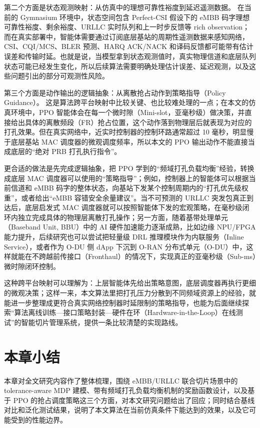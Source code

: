 第二个方面是状态观测映射：从仿真中的理想可靠性裕度到延迟遥测数据。 在当前的 Gymnasium 环境中，状态空间包含 Perfect-CSI 假设下的 eMBB 码字理想可靠性裕度、剩余裕度、URLLC 实时队列和上一时步反馈等 rich observation；而在真实部署中，智能体需要通过订阅底层基站的周期性遥测数据来感知网络，CSI、CQI/MCS、BLER 预测、HARQ ACK/NACK 和译码反馈都可能带有估计误差和传输时延。也就是说，当模型拿到状态观测值时，真实物理信道和底层队列状态可能已经发生变化，所以后续算法需要明确处理估计误差、延迟观测，以及这些问题引出的部分可观测性风险。

第三个方面是动作输出的逻辑抽象：从离散抢占动作到策略指导（Policy Guidance）。 这是算法跨平台映射中比较关键、也比较难处理的一点；在本文的仿真环境中，PPO 智能体会在每一个微时隙（Mini-slot，亚毫秒级）做决策，并直接给出具体的离散频段（FR）抢占位置，这个动作落到物理层后就表现为对应的打孔效果。但在真实网络中，近实时控制器的控制环路通常超过 10 毫秒，明显慢于底层基站 MAC 调度器的微观调度频率，所以本文的 PPO 输出动作不能直接当成底层的``绝对 PRB 打孔执行指令''。

更合适的做法是先完成逻辑抽象，把 PPO 学到的``频域打孔负载均衡''经验，转换成底层 MAC 调度器可以使用的``策略指导''；例如，控制器上的智能体可以根据当前信道和 eMBB 码字的整体状态，向基站下发某个控制周期内的``打孔优先级权重''，或者给出``eMBB 容错安全余量建议''。当不可预测的 URLLC 突发包真正到达后，底层启发式 MAC 调度器就可以按照智能体下发的宏观策略，在毫秒级闭环内独立完成具体的物理层离散打孔操作；另一方面，随着基带处理单元（Baseband Unit, BBU）中的 AI 硬件加速能力逐渐成熟，比如边缘 NPU/FPGA 能力提升，后续研究也可以尝试把轻量级 DRL 推理模块作为内联服务（Inline Service），或者作为 O-DU 侧 dApp 下沉到 O-RAN 分布式单元（O-DU）中，这样就能在不跨越前传接口（Fronthaul）的情况下，实现真正的亚毫秒级（Sub-ms）微时隙闭环控制。

这种跨平台映射可以理解为：上层智能体先给出策略意图，底层调度器再执行更细的微观决策；这样一来，本文算法里把打孔压力分散到不同频域资源上的经验，就能进一步整理成更符合真实网络控制器时延限制的策略指导，也能为后面继续探索``算法离线训练---接口策略封装---硬件在环（Hardware-in-the-Loop）在线测试''的智能切片管理系统，提供一条比较清楚的实现路线。

\section{本章小结}\label{54-ux672cux7ae0ux5c0fux7ed3}

本章对全文研究内容作了整体梳理，围绕 eMBB/URLLC 联合切片场景中的 tolerance-aware MDP 建模、带有频域打孔负载均衡机制的奖励函数设计，以及基于 PPO 的抢占调度策略这三个方面，对本文研究问题给出了回应；同时结合基线对比和泛化测试结果，说明了本文算法在当前仿真条件下能达到的效果，以及它可能受到的性能边界。

